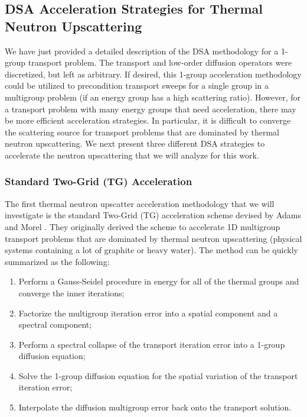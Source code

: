 \subsection{DSA Acceleration Strategies for Thermal Neutron Upscattering}
\label{sec::DSA_DSA_MG}

We have just provided a detailed description of the DSA methodology for a 1-group transport problem. The transport and low-order diffusion operators were discretized, but left as arbitrary. If desired, this 1-group acceleration methodology could be utilized to precondition transport sweeps for a single group in a multigroup problem (if an energy group has a high scattering ratio). However, for a transport problem with many energy groups that need acceleration, there may be more efficient acceleration strategies. In particular, it is difficult to converge the scattering source for transport problems that are dominated by thermal neutron upscattering. We next present three different DSA strategies to accelerate the neutron upscattering that we will analyze for this work.

\subsubsection{Standard Two-Grid (TG) Acceleration}
\label{sec:DSA_DSA_MG_TG}

The first thermal neutron upscatter acceleration methodology that we will investigate is the standard Two-Grid (TG) acceleration scheme devised by Adams and Morel \cite{adams1993two}. They originally derived the scheme to accelerate 1D multigroup transport problems that are dominated by thermal neutron upscattering (physical systems containing a lot of graphite or heavy water). The method can be quickly summarized as the following:

\begin{enumerate}
\item Perform a Gauss-Seidel procedure in energy for all of the thermal groups and converge the inner iterations;
\item Factorize the multigroup iteration error into a spatial component and a spectral component;
\item Perform a spectral collapse of the transport iteration error into a 1-group diffusion equation;
\item Solve the 1-group diffusion equation for the spatial variation of the transport iteration error;
\item Interpolate the diffusion multigroup error back onto the transport solution.
\end{enumerate}

